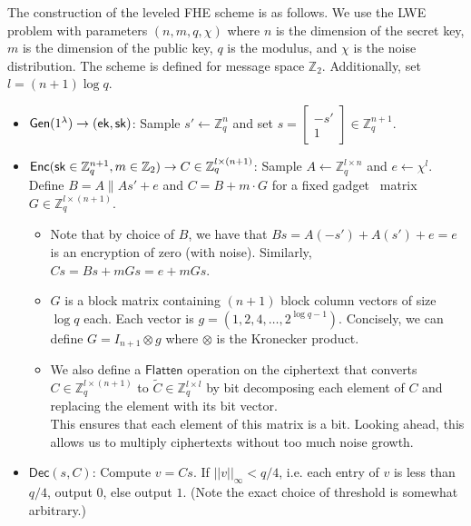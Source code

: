 \documentclass[12pt]{tufte-book}
\newcommand{\ek}{\mathsf{ek}}
\begin{document}
The construction of the leveled FHE scheme is as follows. We use the LWE problem with parameters $(n, m, q, \chi)$ where $n$ is the dimension of the secret key, $m$ is the dimension of the public key, $q$ is the modulus, and $\chi$ is the noise distribution. The scheme is defined for message space $\mathbb{Z}_2$. Additionally, set $l = (n+1) \log q$.
\begin{itemize}
    \item $\mathsf{Gen}(1^\lambda) \rightarrow (\ek, \sk)$: Sample $s' \gets \mathbb{Z}_q^{n}$ and set $s =  
    \begin{bmatrix}
        -s' \\
        1
    \end{bmatrix} \in \mathbb{Z}_q^{n+1}$. 

    \item $\mathsf{Enc}(\mathsf{sk} \in \mathbb{Z}_q^{n+1}, m \in \mathbb{Z}_2) \rightarrow C \in \mathbb{Z}_q^{l \times (n+1)}$: Sample $A \gets \mathbb{Z}_q^{l \times n}$ and $e \gets \chi^{l}$. Define $B = A \| As' + e$ and $C = B + m \cdot G$ for a fixed gadget~\cite{EC:MicPei12} matrix $G \in \mathbb{Z}_q^{l \times (n+1)}$.

    \begin{itemize}
        \item Note that by choice of $B$, we have that $Bs = A(-s') + A(s') + e = e$ is an encryption of zero (with noise). Similarly, $Cs = Bs + mGs = e + mGs$. 
        \item $G$ is a block matrix containing $(n+1)$ block column vectors of size $\log q$ each. Each vector is $g = (1, 2, 4, \ldots, 2^{\log q - 1})$. Concisely, we can define $G = I_{n+1} \otimes g$ where $\otimes$ is the Kronecker product.
        \item We also define a $\mathsf{Flatten}$ operation on the ciphertext that converts $C \in \mathbb{Z}_q^{l \times (n+1)}$ to $\tilde{C} \in \mathbb{Z}_q^{l \times l}$ by bit decomposing each element of $C$ and replacing the element with its bit vector. \\
        This ensures that each element of this matrix is a bit. Looking ahead, this allows us to multiply ciphertexts without too much noise growth.
    \end{itemize}

\end{itemize} \begin{itemize}
    \item $\mathsf{Dec}(s, C)$: Compute $v = Cs$. If $||v||_\infty < q/4$, i.e. each entry of $v$ is less than $q/4$, output $0$, else output $1$. (Note the exact choice of threshold is somewhat arbitrary.)


\end{itemize}
\end{document}
